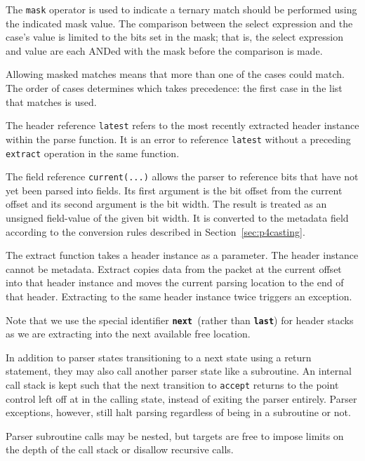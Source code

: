 \documentclass[12pt]{article}
\begin{document}
The \texttt{mask} operator is used to indicate a ternary match should be performed 
using the indicated mask value. The comparison between the select expression 
and the case's value is limited to the bits set in the mask; that is, the 
select expression and value are each ANDed with the mask before the comparison 
is made. 

Allowing masked matches means that more than one of the cases could match. The
order of cases determines which takes precedence: the first case in the list
that matches is used.

The header reference \texttt{latest} refers to the most recently extracted header 
instance within the parse function.  It is an error to reference \texttt{latest} without 
a preceding \texttt{extract} operation in the same function.

The field reference \texttt{current(...)} allows the parser to reference bits that 
have not yet been parsed into fields. Its first argument is the bit offset 
from the current offset and its second argument is the bit width.  The result 
is treated as an unsigned field-value of the given bit width. It is converted 
to the metadata field according to the conversion rules described in 
Section~\ref{sec:p4casting}.


The extract function takes a header instance as a parameter. The header instance
cannot be metadata. Extract copies data from the packet at the current offset
into that header instance and moves the current parsing location to the end of
that header. Extracting to the same header instance twice triggers an exception.

Note that we use the special identifier \texttt{\textbf{next} }(rather than
\texttt{\textbf{last}}) for header stacks as we are extracting into the next
available free location.


In addition to parser states transitioning to a next state using a return
statement, they may also call another parser state like a subroutine. An
internal call stack is kept such that the next transition to \texttt{accept}
returns to the point control left off at in the calling state, instead of
exiting the parser entirely. Parser exceptions, however, still halt parsing
regardless of being in a subroutine or not.

Parser subroutine calls may be nested, but targets are free to impose
limits on the depth of the call stack or disallow recursive calls.
\end{document}
